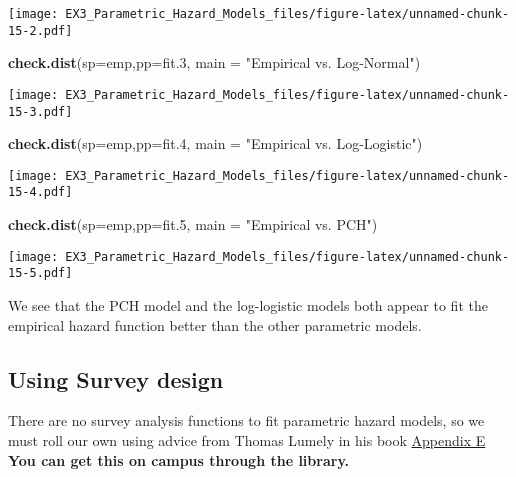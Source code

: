 \documentclass[
]{article}
\newenvironment{Shaded}{\begin{snugshade}}{\end{snugshade}}
\newcommand{\DataTypeTok}[1]{\textcolor[rgb]{0.13,0.29,0.53}{#1}}
\newcommand{\FloatTok}[1]{\textcolor[rgb]{0.00,0.00,0.81}{#1}}
\newcommand{\KeywordTok}[1]{\textcolor[rgb]{0.13,0.29,0.53}{\textbf{#1}}}
\newcommand{\NormalTok}[1]{#1}
\newcommand{\StringTok}[1]{\textcolor[rgb]{0.31,0.60,0.02}{#1}}
\begin{document}
\texttt{[image: EX3\_Parametric\_Hazard\_Models\_files/figure-latex/unnamed-chunk-15-2.pdf]}

\begin{Shaded}
\begin{Highlighting}[]
\KeywordTok{check.dist}\NormalTok{(}\DataTypeTok{sp=}\NormalTok{emp,}\DataTypeTok{pp=}\NormalTok{fit}\FloatTok{.3}\NormalTok{, }\DataTypeTok{main =} \StringTok{"Empirical vs. Log-Normal"}\NormalTok{)}
\end{Highlighting}
\end{Shaded}

\texttt{[image: EX3\_Parametric\_Hazard\_Models\_files/figure-latex/unnamed-chunk-15-3.pdf]}

\begin{Shaded}
\begin{Highlighting}[]
\KeywordTok{check.dist}\NormalTok{(}\DataTypeTok{sp=}\NormalTok{emp,}\DataTypeTok{pp=}\NormalTok{fit}\FloatTok{.4}\NormalTok{, }\DataTypeTok{main =} \StringTok{"Empirical vs. Log-Logistic"}\NormalTok{)}
\end{Highlighting}
\end{Shaded}

\texttt{[image: EX3\_Parametric\_Hazard\_Models\_files/figure-latex/unnamed-chunk-15-4.pdf]}

\begin{Shaded}
\begin{Highlighting}[]
\KeywordTok{check.dist}\NormalTok{(}\DataTypeTok{sp=}\NormalTok{emp,}\DataTypeTok{pp=}\NormalTok{fit}\FloatTok{.5}\NormalTok{, }\DataTypeTok{main =} \StringTok{"Empirical vs. PCH"}\NormalTok{)}
\end{Highlighting}
\end{Shaded}

\texttt{[image: EX3\_Parametric\_Hazard\_Models\_files/figure-latex/unnamed-chunk-15-5.pdf]}

We see that the PCH model and the log-logistic models both appear to fit
the empirical hazard function better than the other parametric models.

\hypertarget{using-survey-design}{%
\subsection{Using Survey design}\label{using-survey-design}}

There are no survey analysis functions to fit parametric hazard models,
so we must roll our own using advice from Thomas Lumely in his book
\href{http://uq5sd9vt7m.search.serialssolutions.com/?ctx_ver=Z39.88-2004\&ctx_enc=info\%3Aofi\%2Fenc\%3AUTF-8\&rfr_id=info\%3Asid\%2Fsummon.serialssolutions.com\&rft_val_fmt=info\%3Aofi\%2Ffmt\%3Akev\%3Amtx\%3Abook\&rft.genre=book\&rft.title=Wiley+Series+in+Survey+Methodology\&rft.au=Lumley\%2C+Thomas\&rft.date=2010-03-11\&rft.pub=Wiley\&rft.isbn=9780470284308\&rft.externalDocID=10375602\&paramdict=en-US}{Appendix
E} \textbf{You can get this on campus through the library.}
\end{document}
